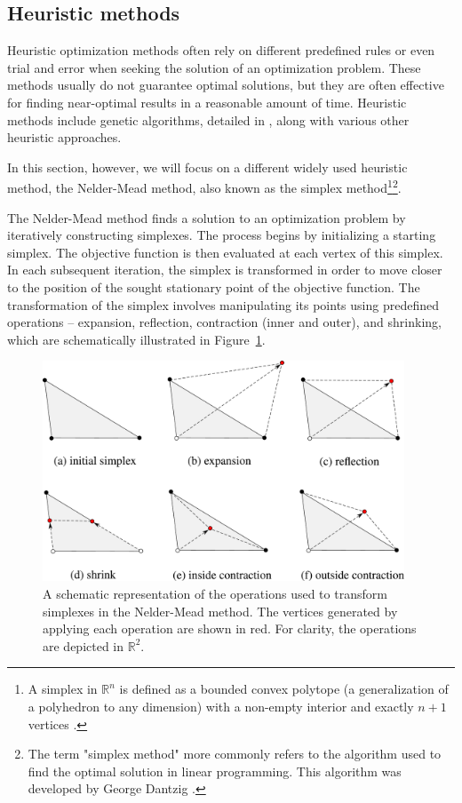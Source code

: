 \subsection{Heuristic methods}\label{heuristic}
Heuristic optimization methods often rely on different predefined rules or even trial and error when seeking the solution of an optimization problem. These methods usually do not guarantee optimal solutions, but they are often effective for finding near-optimal results in a reasonable amount of time. Heuristic methods include genetic algorithms, detailed in \cite{BBO-textbook}, along with various other heuristic approaches.

In this section, however, we will focus on a different widely used heuristic method, the Nelder-Mead method, also known as the simplex method\footnote{A simplex in $ \mathbb{R}^n $ is defined as a bounded convex polytope (a generalization of a polyhedron to any dimension) with a non-empty interior and exactly $ n+1 $ vertices \cite{BBO-textbook}.}\footnote{The term "simplex method" more commonly refers to the algorithm used to find the optimal solution in linear programming. This algorithm was developed by George Dantzig \cite{Dantzig1990}.}\cite{Nelder1965}.

The Nelder-Mead method finds a solution to an optimization problem by iteratively constructing simplexes. The process begins by initializing a starting simplex. The objective function is then evaluated at each vertex of this simplex. In each subsequent iteration, the simplex is transformed in order to move closer to the position of the sought stationary point of the objective function. The transformation of the simplex involves manipulating its points using predefined operations -- expansion, reflection, contraction (inner and outer), and shrinking, which are schematically illustrated in Figure~\ref{fig:NM operations}. 

\begin{figure}[H]
	\centering
	\includegraphics[width=0.96\textwidth]{figures/neldermead.pdf}
	\vspace{2mm}
	\caption{A schematic representation of the operations used to transform simplexes in the Nelder-Mead method. The vertices generated by applying each operation are shown in red. For clarity, the operations are depicted in $ \mathbb{R}^2 $.}
	\label{fig:NM operations}
\end{figure}

